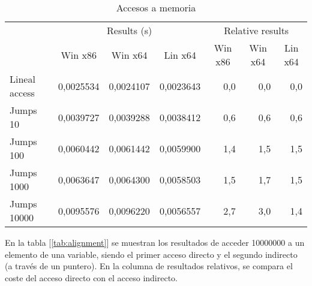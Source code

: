 \begin{table}[h]
\centering
\begin{tabular}{@{}l|rrr|rrr|@{}}
\cmidrule(l){2-7}
                                    & \multicolumn{3}{c|}{Results (s)}                                                               & \multicolumn{3}{c|}{Relative results}                                                      \\ \cmidrule(l){2-7} 
                                    & \multicolumn{1}{c|}{Win x86} & \multicolumn{1}{c|}{Win x64} & \multicolumn{1}{c|}{Lin x64} & \multicolumn{1}{c|}{Win x86} & \multicolumn{1}{c|}{Win x64} & \multicolumn{1}{c|}{Lin x64} \\ \midrule
\multicolumn{1}{|l|}{Lineal access} & 0,0025534                    & 0,0024107                    & 0,0023643                    & 0,0                          & 0,0                          & 0,0                          \\ \cmidrule(r){1-1}
\multicolumn{1}{|l|}{Jumps 10}      & 0,0039727                    & 0,0039288                    & 0,0038412                    & 0,6                          & 0,6                          & 0,6                          \\ \cmidrule(r){1-1}
\multicolumn{1}{|l|}{Jumps 100}     & 0,0060442                    & 0,0061442                    & 0,0059900                    & 1,4                          & 1,5                          & 1,5                          \\ \cmidrule(r){1-1}
\multicolumn{1}{|l|}{Jumps 1000}    & 0,0063647                    & 0,0064300                    & 0,0058503                    & 1,5                          & 1,7                          & 1,5                          \\ \cmidrule(r){1-1}
\multicolumn{1}{|l|}{Jumps 10000}   & 0,0095576                    & 0,0096220                    & 0,0056557                    & 2,7                          & 3,0                          & 1,4                          \\ \bottomrule
\end{tabular}
\caption{Accesos a memoria}
\label{tab:memory}
\end{table}

En la tabla [\ref{tab:alignment}] se muestran los resultados de acceder 10000000 a un elemento de una variable, siendo el primer acceso directo y el segundo indirecto (a través de un puntero). En la columna de resultados relativos, se compara el coste del acceso directo con el acceso indirecto.\\

